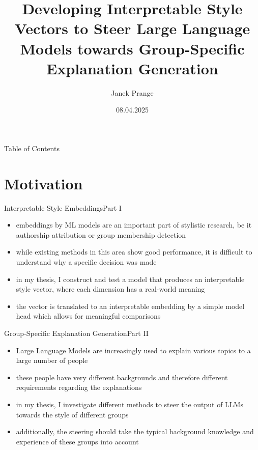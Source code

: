 \documentclass[]{beamer}
\title[Master's Thesis Presentation]{Developing Interpretable Style Vectors to Steer Large Language Models towards Group-Specific Explanation Generation}
\date{08.04.2025}
\author{Janek Prange}
\begin{document}
\begin{frame}
  \titlepage
\end{frame}

\begin{frame}[shrink,t]{Table of Contents}
  \tableofcontents
\end{frame}


\section{Motivation}
\begin{frame}{Interpretable Style Embeddings}{Part I}
  \begin{itemize}
    \item embeddings by ML models are an important part of stylistic research, be it authorship attribution or group membership detection
    \item while existing methods in this area show good performance, it is difficult to understand why a specific decision was made
          \pause
    \item in my thesis, I construct and test a model that produces an interpretable style vector, where each dimension has a real-world meaning
    \item the vector is translated to an interpretable embedding by a simple model head which allows for meaningful comparisons
  \end{itemize}
\end{frame}

\begin{frame}{Group-Specific Explanation Generation}{Part II}
  \begin{itemize}
    \item Large Language Models are increasingly used to explain various topics to a large number of people
    \item these people have very different backgrounds and therefore different requirements regarding the explanations
          \pause
    \item in my thesis, I investigate different methods to steer the output of LLMs towards the style of different groups
    \item additionally, the steering should take the typical background knowledge and experience of these groups into account
  \end{itemize}
\end{frame}
\end{document}
